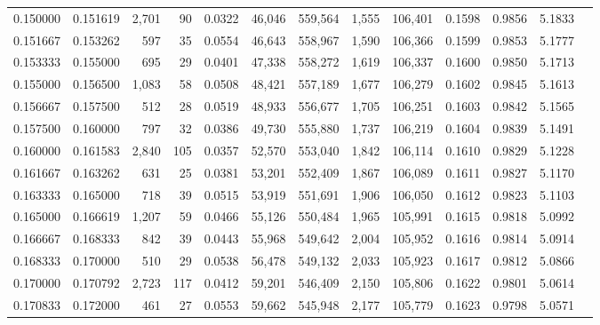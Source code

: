 \begin{tabular}{rrrrrrrrrrrrr}
0.150000 & 0.151619 & 2,701 &  90 &                                     0.0322 &  46,046 & 559,564 &   1,555 & 106,401 & 0.1598 & 0.9856 & 5.1833 \\
0.151667 & 0.153262 &   597 &  35 &                                     0.0554 &  46,643 & 558,967 &   1,590 & 106,366 & 0.1599 & 0.9853 & 5.1777 \\
0.153333 & 0.155000 &   695 &  29 &                                     0.0401 &  47,338 & 558,272 &   1,619 & 106,337 & 0.1600 & 0.9850 & 5.1713 \\
0.155000 & 0.156500 & 1,083 &  58 &                                     0.0508 &  48,421 & 557,189 &   1,677 & 106,279 & 0.1602 & 0.9845 & 5.1613 \\
0.156667 & 0.157500 &   512 &  28 &                                     0.0519 &  48,933 & 556,677 &   1,705 & 106,251 & 0.1603 & 0.9842 & 5.1565 \\
0.157500 & 0.160000 &   797 &  32 &                                     0.0386 &  49,730 & 555,880 &   1,737 & 106,219 & 0.1604 & 0.9839 & 5.1491 \\
0.160000 & 0.161583 & 2,840 & 105 &                                     0.0357 &  52,570 & 553,040 &   1,842 & 106,114 & 0.1610 & 0.9829 & 5.1228 \\
0.161667 & 0.163262 &   631 &  25 &                                     0.0381 &  53,201 & 552,409 &   1,867 & 106,089 & 0.1611 & 0.9827 & 5.1170 \\
0.163333 & 0.165000 &   718 &  39 &                                     0.0515 &  53,919 & 551,691 &   1,906 & 106,050 & 0.1612 & 0.9823 & 5.1103 \\
0.165000 & 0.166619 & 1,207 &  59 &                                     0.0466 &  55,126 & 550,484 &   1,965 & 105,991 & 0.1615 & 0.9818 & 5.0992 \\
0.166667 & 0.168333 &   842 &  39 &                                     0.0443 &  55,968 & 549,642 &   2,004 & 105,952 & 0.1616 & 0.9814 & 5.0914 \\
0.168333 & 0.170000 &   510 &  29 &                                     0.0538 &  56,478 & 549,132 &   2,033 & 105,923 & 0.1617 & 0.9812 & 5.0866 \\
0.170000 & 0.170792 & 2,723 & 117 &                                     0.0412 &  59,201 & 546,409 &   2,150 & 105,806 & 0.1622 & 0.9801 & 5.0614 \\
0.170833 & 0.172000 &   461 &  27 &                                     0.0553 &  59,662 & 545,948 &   2,177 & 105,779 & 0.1623 & 0.9798 & 5.0571 \\

\end{tabular}
